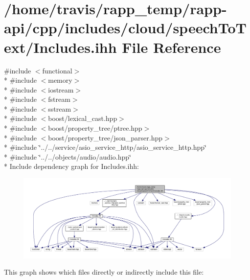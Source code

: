 \hypertarget{cloud_2speechToText_2Includes_8ihh}{\section{/home/travis/rapp\-\_\-temp/rapp-\/api/cpp/includes/cloud/speech\-To\-Text/\-Includes.ihh File Reference}
\label{cloud_2speechToText_2Includes_8ihh}
}
{\ttfamily \#include $<$functional$>$}\\*
{\ttfamily \#include $<$memory$>$}\\*
{\ttfamily \#include $<$iostream$>$}\\*
{\ttfamily \#include $<$fstream$>$}\\*
{\ttfamily \#include $<$sstream$>$}\\*
{\ttfamily \#include $<$boost/lexical\-\_\-cast.\-hpp$>$}\\*
{\ttfamily \#include $<$boost/property\-\_\-tree/ptree.\-hpp$>$}\\*
{\ttfamily \#include $<$boost/property\-\_\-tree/json\-\_\-parser.\-hpp$>$}\\*
{\ttfamily \#include \char`\"{}../../service/asio\-\_\-service\-\_\-http/asio\-\_\-service\-\_\-http.\-hpp\char`\"{}}\\*
{\ttfamily \#include \char`\"{}../../objects/audio/audio.\-hpp\char`\"{}}\\*
Include dependency graph for Includes.\-ihh\-:
\nopagebreak
\begin{figure}[H]
\begin{center}
\leavevmode
\includegraphics[width=350pt]{cloud_2speechToText_2Includes_8ihh__incl}
\end{center}
\end{figure}
This graph shows which files directly or indirectly include this file\-:
\nopagebreak
